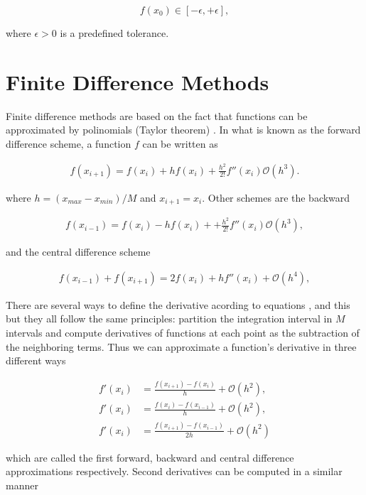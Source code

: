 $$f(x_0) \in [-\epsilon,+\epsilon],$$

where $\epsilon>0$ is a predefined tolerance.


\section{Finite Difference Methods}

\par Finite difference methods are based on the fact that functions can be approximated by polinomials (Taylor theorem) \cite{kiusalaas}. In what is known as the forward difference scheme, a function $f$ can be written as

\begin{align}
	\label{eq:forward-difference}
	f(x_{i+1})=f(x_i) + hf (x_i) + \frac{h^2}{2!} f''(x_i)\mathcal{O}(h^3).
\end{align}

where $h = (x_{max}-x_{min})/M$ and $x_{i+1} = x_i$. Other  schemes are the backward 

\begin{align}
\label{eq:backward-difference}
	f(x_{i-1})=f(x_i) - hf (x_i) + + \frac{h^2}{2!} f''(x_i)\mathcal{O}(h^3),
\end{align}

and the central difference scheme


\begin{align}
\label{eq:central-difference}
	f(x_{i-1}) + f(x_{i+1})= 2f(x_i) + hf''(x_i) + \mathcal{O}(h^4),
\end{align}


There are several ways to define the derivative acording to equations \label{eq:backward-difference}, \label{eq:forward-difference} and \label{eq:central-difference} this but they all follow the same principles: partition the integration interval in $M$ intervals and compute derivatives of functions at each point as the subtraction of the neighboring terms. Thus we can approximate a function's derivative in three different ways

\begin{align}
	f'(x_i) &= \frac{f(x_{i+1})-f(x_{i})}{h} + \mathcal{O}(h^2),\\
	f'(x_i) &= \frac{f(x_{i})-f(x_{i-1})}{h} + \mathcal{O}(h^2),\\
	f'(x_i) &= \frac{f(x_{i+1})-f(x_{i-1})}{2h} + \mathcal{O}(h^2)
\end{align}

which are called the first forward, backward and central difference approximations respectively. 
Second derivatives can be computed in a similar manner

